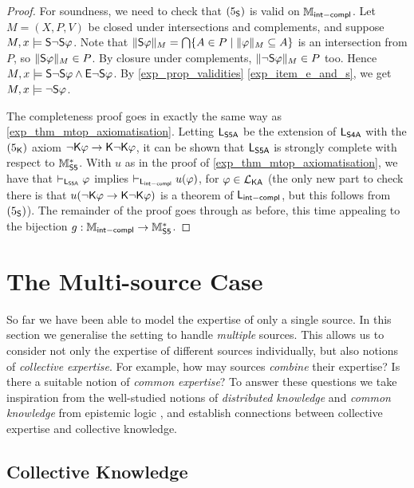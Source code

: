 \begin{proof}
    For soundness, we need to check that $\fivesoundness$ is valid on
    $\Mintcompl$. Let $M = (X, P, V)$ be closed under intersections and
    complements, and suppose $M, x \models \S\neg\S\phi$. Note that
    $\|\S\phi\|_M = \bigcap\{A \in P \mid \|\phi\|_M \subseteq A\}$ is an
    intersection from $P$, so $\|\S\phi\|_M \in P$. By closure under
    complements, $\|\neg\S\phi\|_M \in P$ too. Hence $M, x \models \S\neg\S\phi
    \land \E\neg\S\phi$. By \cref{exp_prop_validities} \cref{exp_item_e_and_s},
    we get $M, x \models \neg\S\phi$.

    The completeness proof goes in exactly the same way as
    \cref{exp_thm_mtop_axiomatisation}. Letting $\sLsfivea$ be the extension of
    $\sLsfoura$ with the $\fivek$ axiom $\neg\K\phi \limplies \K\neg\K\phi$, it
    can be shown that $\sLsfivea$ is strongly complete with respect to
    $\Msfive$.  With $u$ as in the proof of \cref{exp_thm_mtop_axiomatisation}, we
    have that $\entails_{\sLsfivea} \phi$ implies $\entails_{\sLintcompl}
    u(\phi)$, for $\phi \in \cLKA$ (the only new part to check there is that
    $u(\neg\K\phi \limplies \K\neg\K\phi)$ is a theorem of $\sLintcompl$, but
    this follows from $\fivesoundness$). The remainder of the proof goes
    through as before, this time appealing to the bijection $g: \Mintcompl \to
    \Msfive$.
\end{proof}

\section{The Multi-source Case}
\label{exp_sec_multisource}

So far we have been able to model the expertise of only a single
source. In this section we generalise the setting to handle \emph{multiple}
sources. This allows us to consider not only the expertise of different
sources individually, but also notions of \emph{collective expertise}. For
example, how may sources \emph{combine} their expertise? Is there a suitable
notion of
\emph{common expertise}? To answer these questions we take inspiration from the
well-studied notions of \emph{distributed knowledge} and \emph{common
knowledge} from epistemic logic \cite{fagin2003reasoning}, and
establish connections between collective expertise and collective knowledge.

\subsection{Collective Knowledge}

